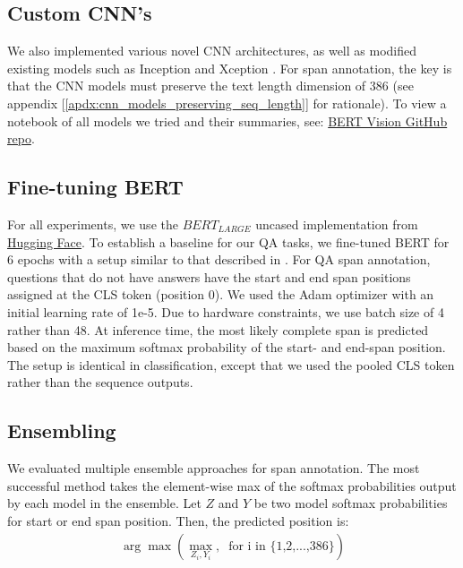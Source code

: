 \subsection{Custom CNN's}

We also implemented various novel CNN architectures, as well as modified existing models such as Inception and Xception \citep{DBLP:journals/corr/SzegedyLJSRAEVR14, DBLP:journals/corr/Chollet16a}. For span annotation, the key is that the CNN models must preserve the text length dimension of 386 (see appendix [\ref{apdx:cnn_models_preserving_seq_length}] for rationale). To view a notebook of all models we tried and their summaries, see: \href{https://github.com/cbenge509/BERTVision}{BERT Vision GitHub repo}.

\subsection{Fine-tuning BERT}

For all experiments, we use the $BERT_{LARGE}$ uncased implementation from \href{https://huggingface.co/}{Hugging Face}. To establish a baseline for our QA tasks, we fine-tuned BERT for 6 epochs with a setup similar to that described in \cite{Devlin2019}. For QA span annotation, questions that do not have answers have the start and end span positions assigned at the CLS token (position 0). We used the Adam optimizer with an initial learning rate of 1e-5. Due to hardware constraints, we use batch size of 4 rather than 48. At inference time, the most likely complete span is predicted based on the maximum softmax probability of the start- and end-span position. The setup is identical in classification, except that we used the pooled CLS token rather than the sequence outputs.

\subsection{Ensembling} 

We evaluated multiple ensemble approaches for span annotation. The most successful method takes the element-wise max of the softmax probabilities output by each model in the ensemble. Let $Z$ and $Y$ be two model softmax probabilities for start or end span position. Then, the predicted position is:
\begin{equation} \label{eq2}
\begin{aligned}
\arg\max\left(\underset{{Z_i, Y_i}}{\max},\;\;\text{for i in \{1,2,...,386\}}\right)
\end{aligned}
\end{equation}

